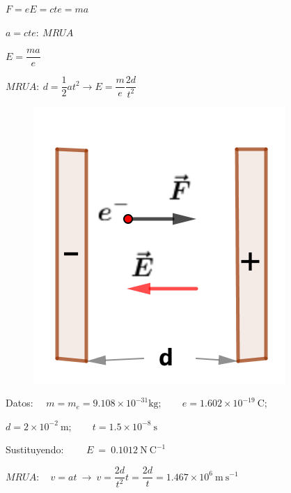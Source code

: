 \begin{multicols}{2}
$F=eE=cte=ma$ 

$a=cte:\ MRUA$

$E=\dfrac{ma}{e}$

$MRUA:\ d=\dfrac 1 2 a t^2 \to E=\dfrac me \dfrac {2d}{t^2}$
\begin{figure}[H]
	\centering
	\includegraphics[width=.25\textwidth]{imagenes/imagenes22/T22IM16.png}
\end{figure}		
\end{multicols}

Datos: $\quad m=m_e=9.108\times 10^{-31} \mathrm{kg};\qquad  e=1.602\times 10^{-19}\ \mathrm{C}; \qquad  $

$d=2\times 10^{-2} \ \mathrm{m}; \qquad t=1.5\times 10^{-8}\ \mathrm{s}$

Sustituyendo: $\qquad E\ = \ 0.1012 \ \mathrm{N \ C}^{-1}$

$MRUA: \quad v=at \ \to \ v=\dfrac{2d}{t^2}t=\dfrac{2d}{t}= 1.467\times 10^6 \ \mathrm{m\ s}^{-1}$


